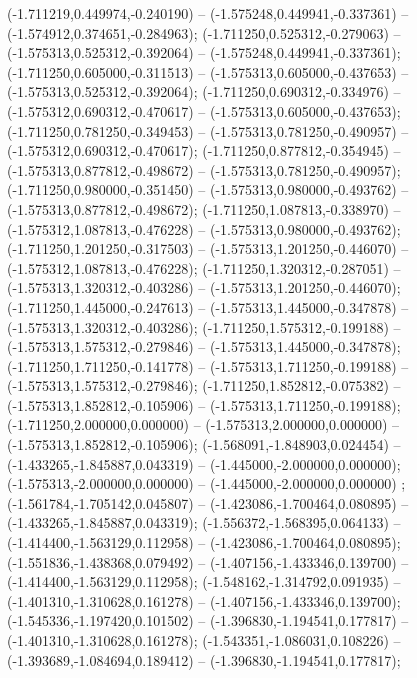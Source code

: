  (-1.711219,0.449974,-0.240190) -- (-1.575248,0.449941,-0.337361) -- (-1.574912,0.374651,-0.284963);
 (-1.711250,0.525312,-0.279063) -- (-1.575313,0.525312,-0.392064) -- (-1.575248,0.449941,-0.337361);
 (-1.711250,0.605000,-0.311513) -- (-1.575313,0.605000,-0.437653) -- (-1.575313,0.525312,-0.392064);
 (-1.711250,0.690312,-0.334976) -- (-1.575312,0.690312,-0.470617) -- (-1.575313,0.605000,-0.437653);
 (-1.711250,0.781250,-0.349453) -- (-1.575313,0.781250,-0.490957) -- (-1.575312,0.690312,-0.470617);
 (-1.711250,0.877812,-0.354945) -- (-1.575313,0.877812,-0.498672) -- (-1.575313,0.781250,-0.490957);
 (-1.711250,0.980000,-0.351450) -- (-1.575313,0.980000,-0.493762) -- (-1.575313,0.877812,-0.498672);
 (-1.711250,1.087813,-0.338970) -- (-1.575312,1.087813,-0.476228) -- (-1.575313,0.980000,-0.493762);
 (-1.711250,1.201250,-0.317503) -- (-1.575313,1.201250,-0.446070) -- (-1.575312,1.087813,-0.476228);
 (-1.711250,1.320312,-0.287051) -- (-1.575313,1.320312,-0.403286) -- (-1.575313,1.201250,-0.446070);
 (-1.711250,1.445000,-0.247613) -- (-1.575313,1.445000,-0.347878) -- (-1.575313,1.320312,-0.403286);
 (-1.711250,1.575312,-0.199188) -- (-1.575313,1.575312,-0.279846) -- (-1.575313,1.445000,-0.347878);
 (-1.711250,1.711250,-0.141778) -- (-1.575313,1.711250,-0.199188) -- (-1.575313,1.575312,-0.279846);
 (-1.711250,1.852812,-0.075382) -- (-1.575313,1.852812,-0.105906) -- (-1.575313,1.711250,-0.199188);
 (-1.711250,2.000000,0.000000) -- (-1.575313,2.000000,0.000000) -- (-1.575313,1.852812,-0.105906);
 (-1.568091,-1.848903,0.024454) -- (-1.433265,-1.845887,0.043319) -- (-1.445000,-2.000000,0.000000);
 (-1.575313,-2.000000,0.000000) -- (-1.445000,-2.000000,0.000000) ;
 (-1.561784,-1.705142,0.045807) -- (-1.423086,-1.700464,0.080895) -- (-1.433265,-1.845887,0.043319);
 (-1.556372,-1.568395,0.064133) -- (-1.414400,-1.563129,0.112958) -- (-1.423086,-1.700464,0.080895);
 (-1.551836,-1.438368,0.079492) -- (-1.407156,-1.433346,0.139700) -- (-1.414400,-1.563129,0.112958);
 (-1.548162,-1.314792,0.091935) -- (-1.401310,-1.310628,0.161278) -- (-1.407156,-1.433346,0.139700);
 (-1.545336,-1.197420,0.101502) -- (-1.396830,-1.194541,0.177817) -- (-1.401310,-1.310628,0.161278);
 (-1.543351,-1.086031,0.108226) -- (-1.393689,-1.084694,0.189412) -- (-1.396830,-1.194541,0.177817);
